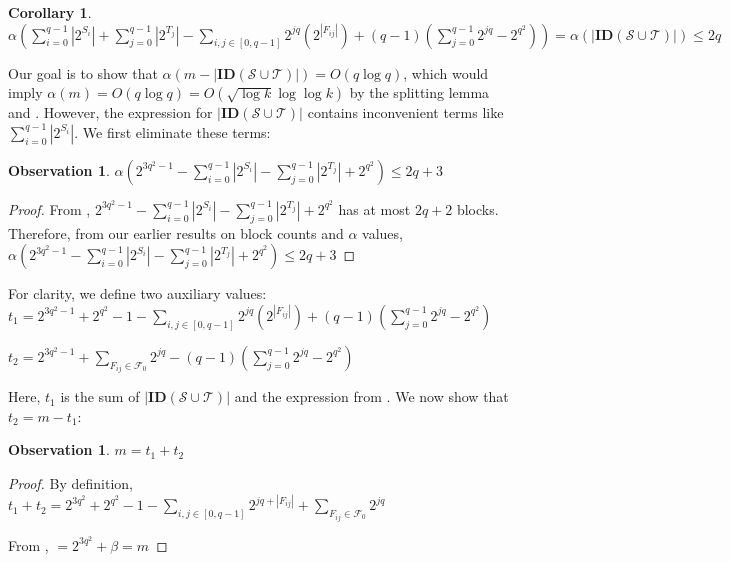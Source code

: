 \documentclass[11pt,a4paper]{article}
\newtheorem{observation}[theorem]{Observation}
\newtheorem{corollary}[theorem]{Corollary}
\theoremstyle{definition}
\begin{document}
\begin{corollary}\label{cons:system1}
	$\alpha(\sum_{i=0}^{q-1} |2^{S_i}| + \sum_{j=0}^{q-1} |2^{T_j}| - 
	\sum_{i,j \in [0,q-1]} 2^{jq}(2^{|F_{ij}|})+(q-1)(\sum_{j=0}^{q-1} 2^{jq} 
	- 2^{q^2})) = \alpha(|\mathbf{ID}(\mathcal{S}\cup \mathcal{T})|) \leq 2q$
\end{corollary}

Our goal is to show that $\alpha(m - |\mathbf{ID}(\mathcal{S}\cup 
\mathcal{T})|) = O(q \log q)$, which would imply $\alpha(m) = 
O(q \log q) = O(\sqrt{\log k} \log \log k)$ by the splitting lemma and 
. However, the expression for 
$|\mathbf{ID}(\mathcal{S}\cup \mathcal{T})|$ contains inconvenient terms 
like $\sum_{i=0}^{q-1} |2^{S_i}|$. We first eliminate these terms:

\begin{observation}\label{cons:system2}
	$\alpha(2^{3q^2-1}-\sum_{i=0}^{q-1} |2^{S_i}| - \sum_{j=0}^{q-1} 
	|2^{T_j}|+2^{q^2}) \leq 2q+3$
\end{observation}

\begin{proof}
	From , $2^{3q^2-1}-\sum_{i=0}^{q-1} |2^{S_i}| - 
	\sum_{j=0}^{q-1} |2^{T_j}|+2^{q^2}$ has at most $2q+2$ blocks. Therefore, 
	from our earlier results on block counts and $\alpha$ values,
	$\alpha(2^{3q^2-1}-\sum_{i=0}^{q-1} |2^{S_i}| - \sum_{j=0}^{q-1} 
	|2^{T_j}|+2^{q^2}) \leq 2q+3$  
\end{proof}

For clarity, we define two auxiliary values:
$t_1=2^{3q^2-1}+2^{q^2}-1 - \sum_{i,j \in [0,q-1]} 2^{jq}(2^{|F_{ij}|})
+(q-1)(\sum_{j=0}^{q-1} 2^{jq} - 2^{q^2})$

$t_2=2^{3q^2-1}+ \sum_{F_{ij}\in \mathcal{F}_0} 2^{jq}- (q-1)
(\sum_{j=0}^{q-1} 2^{jq} - 2^{q^2})$

Here, $t_1$ is the sum of $|\mathbf{ID}(\mathcal{S}\cup \mathcal{T})|$ and 
the expression from . We now show that $t_2 = m - t_1$:

\begin{observation}\label{sumt1t2}
	$m=t_1+t_2$
\end{observation}

\begin{proof}
	By definition,
	$t_1+t_2= 2^{3q^2}+2^{q^2}-1-\sum\limits_{i,j \in [0,q-1]} 2^{jq+|F_{ij}|}
	+\sum\limits_{F_{ij}\in \mathcal{F}_0} 2^{jq}$
	
	From , 
	$=2^{3q^2}+\beta = m$    
\end{proof}
\end{document}
